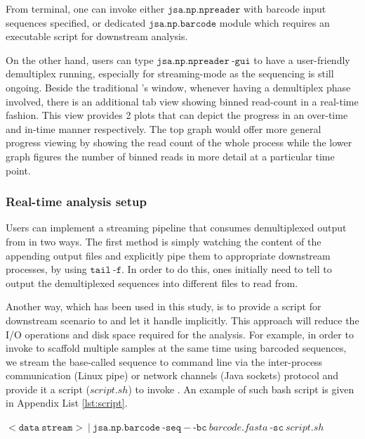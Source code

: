 From terminal, one can invoke either $\mathtt{jsa.np.npreader}$ with barcode input sequences specified, or dedicated $\mathtt{jsa.np.barcode}$ module which requires an executable script for downstream analysis. 

On the other hand, users can type $\mathtt{jsa.np.npreader}\ \text{-}\mathtt{gui}$ to have a user-friendly demultiplex running, especially for streaming-mode as the sequencing is still ongoing.
Beside the traditional \npreader{}'s window, whenever having a demultiplex phase involved, there is an additional tab view showing binned read-count in a real-time fashion. This view provides 2 plots that can depict the progress in an over-time and in-time manner respectively. The top graph would offer more general progress viewing by showing the read count of the whole process while the lower graph figures the number of binned reads in more detail at a particular time point.

\subsubsection{Real-time analysis setup}
Users can implement a streaming pipeline that consumes demultiplexed output from \npbarcode{} in two ways. 
The first method is simply watching the content of the appending output files and explicitly pipe them to appropriate downstream processes, \EG{} by using $\mathtt{tail}\ \text{-}\mathtt{f}$.
In order to do this, ones initially need to tell \npbarcode{} to output the demultiplexed sequences into different files to read from.

Another way, which has been used in this study, is to provide a script for downstream scenario to \npbarcode{} and let it handle implicitly. This approach will reduce the I/O operations and disk space required for the analysis. For example, in order to invoke \npscarf{} to scaffold multiple samples at the same time using barcoded sequences, we stream the base-called sequence to \npbarcode{} command line via the inter-process communication (Linux pipe) or network channels (Java sockets) protocol \cite{CaoGE2015} and provide it a script ($\mathit{script.sh}$) to invoke \npscarf{}. An example of such bash script is given in Appendix List \ref{lst:script}.

$\mathtt{<data \: stream>}~|~\mathtt{jsa.np.barcode} \ \text{-}\mathtt{seq} \ \mathit{-} \ \text{-}\mathtt{bc} \ \mathit{barcode.fasta} \ \text{-}\mathtt{sc} \ \mathit{script.sh}$

